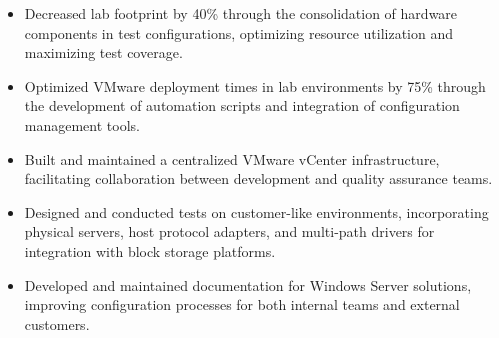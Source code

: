 \documentclass[10pt]{article}       %
\begin{document}
\begin{itemize}
  \item Decreased lab footprint by 40\% through the consolidation of hardware components in test configurations, optimizing resource utilization and maximizing test coverage.
  \item Optimized VMware deployment times in lab environments by 75\% through the development of automation scripts and integration of configuration management tools.
  \item Built and maintained a centralized VMware vCenter infrastructure, facilitating collaboration between development and quality assurance teams.
  \item Designed and conducted tests on customer-like environments, incorporating physical servers, host protocol adapters, and multi-path drivers for integration with block storage platforms.
  \item Developed and maintained documentation for Windows Server solutions, improving configuration processes for both internal teams and external customers.
\end{itemize}



\end{document}
